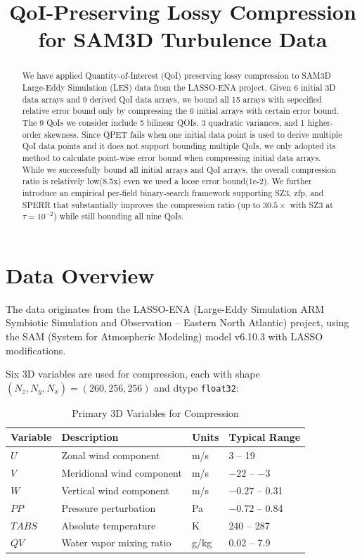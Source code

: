 \documentclass[11pt,a4paper]{article}
\title{QoI-Preserving Lossy Compression for SAM3D Turbulence Data}
\begin{document}
\maketitle

\begin{abstract}
We have applied Quantity-of-Interest (QoI) preserving lossy compression to SAM3D Large-Eddy Simulation (LES) data from the LASSO-ENA project. 
Given 6 initial 3D data arrays and 9 derived QoI data arrays, we bound all 15 arrays with sepecified relative error bound only by compressing the 6 initial arrays with certain error bound.
The 9 QoIs we consider include 5 bilinear QOIs, 3 quadratic variances, and 1 higher-order skewness.
Since QPET fails when one initial data point is used to derive multiple QoI data points and it does not support bounding multiple QoIs, we only adopted its method to calculate point-wise error bound when compressing initial data arrays.
While we successfully bound all initial arrays and QoI arrays, the overall compression ratio is relatively low(8.5x) even we used a loose error bound(1e-2). We further introduce an empirical per-field binary-search framework supporting SZ3, zfp, and SPERR that substantially improves the compression ratio (up to $30.5\times$ with SZ3 at $\tau=10^{-2}$) while still bounding all nine QoIs.
\end{abstract}


\section{Data Overview}

The data originates from the LASSO-ENA (Large-Eddy Simulation ARM Symbiotic Simulation and Observation -- Eastern North Atlantic) project, using the SAM (System for Atmospheric Modeling) model v6.10.3 with LASSO modifications.

Six 3D variables are used for compression, each with shape $(N_z, N_y, N_x) = (260, 256, 256)$ and dtype \texttt{float32}:

\begin{table}[H]
\centering
\caption{Primary 3D Variables for Compression}
\begin{tabular}{llll}
\toprule
\textbf{Variable} & \textbf{Description} & \textbf{Units} & \textbf{Typical Range} \\
\midrule
$U$ & Zonal wind component & m/s & 3 -- 19 \\
$V$ & Meridional wind component & m/s & $-22$ -- $-3$ \\
$W$ & Vertical wind component & m/s & $-0.27$ -- 0.31 \\
$PP$ & Pressure perturbation & Pa & $-0.72$ -- 0.84 \\
$TABS$ & Absolute temperature & K & 240 -- 287 \\
$QV$ & Water vapor mixing ratio & g/kg & 0.02 -- 7.9 \\
\bottomrule
\end{tabular}
\end{table}
\end{document}
